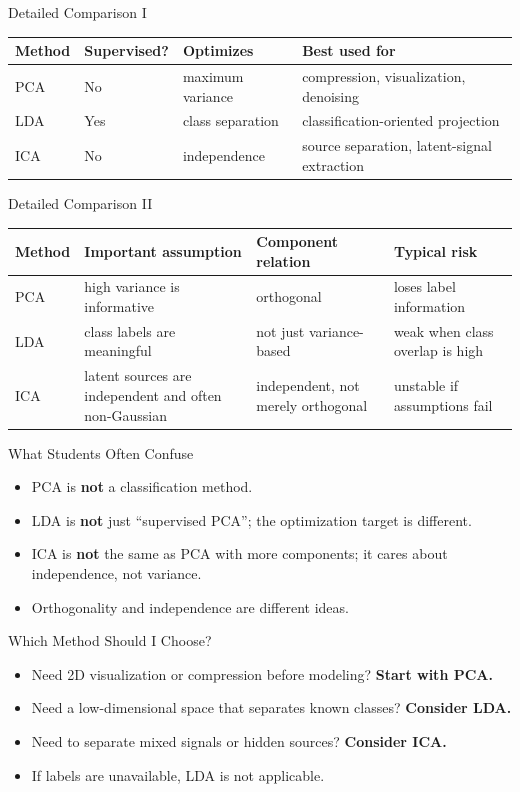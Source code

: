 \documentclass[aspectratio=169]{beamer}
\begin{document}
\begin{frame}{Detailed Comparison I}
  \centering
  \begin{tabular}{p{2.1cm}p{2.2cm}p{3.1cm}p{3.5cm}}
    \toprule
    \textbf{Method} & \textbf{Supervised?} & \textbf{Optimizes} & \textbf{Best used for} \\
    \midrule
    PCA & No & maximum variance & compression, visualization, denoising \\
    LDA & Yes & class separation & classification-oriented projection \\
    ICA & No & independence & source separation, latent-signal extraction \\
    \bottomrule
  \end{tabular}
\end{frame}

\begin{frame}{Detailed Comparison II}
  \centering
  \begin{tabular}{p{2.1cm}p{2.6cm}p{2.7cm}p{2.8cm}}
    \toprule
    \textbf{Method} & \textbf{Important assumption} & \textbf{Component relation} & \textbf{Typical risk} \\
    \midrule
    PCA & high variance is informative & orthogonal & loses label information \\
    LDA & class labels are meaningful & not just variance-based & weak when class overlap is high \\
    ICA & latent sources are independent and often non-Gaussian & independent, not merely orthogonal & unstable if assumptions fail \\
    \bottomrule
  \end{tabular}
\end{frame}

\begin{frame}{What Students Often Confuse}
  \begin{itemize}[<+->]
    \item PCA is \textbf{not} a classification method.
    \item LDA is \textbf{not} just ``supervised PCA''; the optimization target is different.
    \item ICA is \textbf{not} the same as PCA with more components; it cares about independence, not variance.
    \item Orthogonality and independence are different ideas.
  \end{itemize}
\end{frame}

\begin{frame}{Which Method Should I Choose?}
  \begin{itemize}[<+->]
    \item Need 2D visualization or compression before modeling? \textbf{Start with PCA.}
    \item Need a low-dimensional space that separates known classes? \textbf{Consider LDA.}
    \item Need to separate mixed signals or hidden sources? \textbf{Consider ICA.}
    \item If labels are unavailable, LDA is not applicable.
  \end{itemize}
\end{frame}
\end{document}

